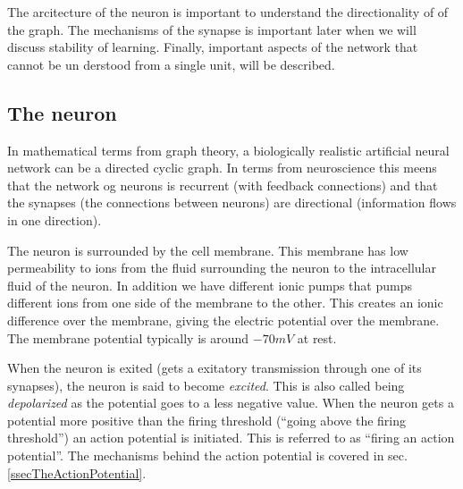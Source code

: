 The arcitecture of the neuron is important to understand the directionality of of the graph. %
	The mechanisms of the synapse is important later when we will discuss stability of learning. 
Finally, important aspects of the network that cannot be un derstood from a single unit, will be described.


\subsection{The neuron}
\label{ssecTheNeuron}
In mathematical terms from graph theory, a biologically realistic artificial neural network can be a directed cyclic graph. 
In terms from neuroscience this meens that the network og neurons is recurrent (with feedback connections) and that the synapses (the connections between neurons) are directional (information flows in one direction). 


The neuron is surrounded by the cell membrane. This membrane has low permeability to ions from the fluid surrounding the neuron to the intracellular fluid of the neuron.
In addition we have different ionic pumps that pumps different ions from one side of the membrane to the other. This creates an ionic difference over the membrane, giving the electric potential over the membrane.
The membrane potential typically is around $-70mV$ at rest.


When the neuron is exited (gets a exitatory transmission through one of its synapses), the neuron is said to become \emph{excited}. 
This is also called being \emph{depolarized} as the potential goes to a less negative value. 
When the neuron gets a potential more positive than the firing threshold (``going above the firing threshold'') an action potential is initiated.
This is referred to as ``firing an action potential''.
The mechanisms behind the action potential is covered in sec. \ref{ssecTheActionPotential}.

